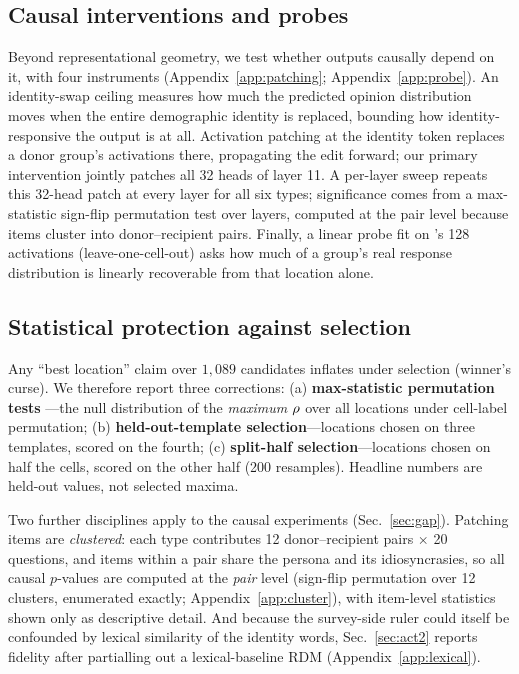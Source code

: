 \subsection{Causal interventions and probes}
\label{sec:setup-causal}
Beyond representational geometry, we test whether outputs causally
depend on it, with four instruments (Appendix~\ref{app:patching};
Appendix~\ref{app:probe}). An identity-swap ceiling measures how much the
predicted opinion distribution moves when the entire demographic
identity is replaced, bounding how identity-responsive the output is at
all. Activation patching at the identity token replaces a donor group's
activations there, propagating the edit forward; our primary
intervention jointly patches all 32 heads of layer 11. A per-layer sweep
repeats this 32-head patch at every layer for all six types; significance
comes from a max-statistic sign-flip permutation test over layers,
computed at the pair level because items cluster into donor--recipient
pairs. Finally, a linear probe fit on \starhead's 128
activations (leave-one-cell-out) asks how much of a group's real
response distribution is linearly recoverable from that location alone.

\subsection{Statistical protection against selection}
\label{sec:setup-selection}
Any ``best location'' claim over $1{,}089$ candidates inflates under
selection (winner's curse). We therefore report three corrections:
(a) \textbf{max-statistic permutation tests} \citep{nichols2002}---the
null distribution of the \emph{maximum} $\rho$ over all locations under
cell-label permutation; (b) \textbf{held-out-template selection}---locations chosen
on three templates, scored on the fourth; (c) \textbf{split-half
selection}---locations chosen on half the cells, scored on the other half
(200 resamples). Headline numbers are held-out values, not selected
maxima.

Two further disciplines apply to the causal experiments
(Sec.~\ref{sec:gap}). Patching items are \emph{clustered}: each
type contributes 12 donor--recipient pairs $\times$ 20 questions, and
items within a pair share the persona and its idiosyncrasies, so all
causal $p$-values are computed at the \emph{pair} level (sign-flip
permutation over 12 clusters, enumerated exactly;
Appendix~\ref{app:cluster}), with item-level statistics shown only as
descriptive detail. And because the survey-side ruler could itself be
confounded by lexical similarity of the identity words,
Sec.~\ref{sec:act2} reports fidelity after partialling out a
lexical-baseline RDM (Appendix~\ref{app:lexical}).

